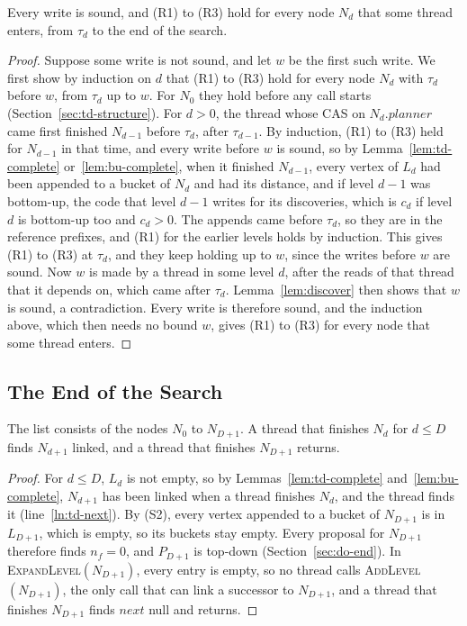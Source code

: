 \begin{lemma}
\label{lem:ready}
Every write is sound, and (R1) to (R3) hold for every node $N_d$ that some thread enters, from $\tau_d$ to the end of the search.
\end{lemma}
\begin{proof}
Suppose some write is not sound, and let $w$ be the first such write. We first show by induction on $d$ that (R1) to (R3) hold for every node $N_d$ with $\tau_d$ before $w$, from $\tau_d$ up to $w$. For $N_0$ they hold before any call starts (Section~\ref{sec:td-structure}). For $d > 0$, the thread whose CAS on $N_d.\mathit{planner}$ came first finished $N_{d-1}$ before $\tau_d$, after $\tau_{d-1}$. By induction, (R1) to (R3) held for $N_{d-1}$ in that time, and every write before $w$ is sound, so by Lemma~\ref{lem:td-complete} or~\ref{lem:bu-complete}, when it finished $N_{d-1}$, every vertex of $L_d$ had been appended to a bucket of $N_d$ and had its distance, and if level $d-1$ was bottom-up, the code that level $d-1$ writes for its discoveries, which is $c_d$ if level $d$ is bottom-up too and $c_d > 0$. The appends came before $\tau_d$, so they are in the reference prefixes, and (R1) for the earlier levels holds by induction. This gives (R1) to (R3) at $\tau_d$, and they keep holding up to $w$, since the writes before $w$ are sound. Now $w$ is made by a thread in some level $d$, after the reads of that thread that it depends on, which came after $\tau_d$. Lemma~\ref{lem:discover} then shows that $w$ is sound, a contradiction. Every write is therefore sound, and the induction above, which then needs no bound $w$, gives (R1) to (R3) for every node that some thread enters.
\end{proof}

\subsection{The End of the Search}
\label{sec:pf-end}

\begin{lemma}
\label{lem:end}
The list consists of the nodes $N_0$ to $N_{D+1}$. A thread that finishes $N_d$ for $d \leq D$ finds $N_{d+1}$ linked, and a thread that finishes $N_{D+1}$ returns.
\end{lemma}
\begin{proof}
For $d \leq D$, $L_d$ is not empty, so by Lemmas~\ref{lem:td-complete} and~\ref{lem:bu-complete}, $N_{d+1}$ has been linked when a thread finishes $N_d$, and the thread finds it (line~\ref{ln:td-next}). By (S2), every vertex appended to a bucket of $N_{D+1}$ is in $L_{D+1}$, which is empty, so its buckets stay empty. Every proposal for $N_{D+1}$ therefore finds $n_f = 0$, and $P_{D+1}$ is top-down (Section~\ref{sec:do-end}). In \textsc{ExpandLevel}$(N_{D+1})$, every entry is empty, so no thread calls \textsc{AddLevel}$(N_{D+1})$, the only call that can link a successor to $N_{D+1}$, and a thread that finishes $N_{D+1}$ finds $\mathit{next}$ null and returns.
\end{proof}


